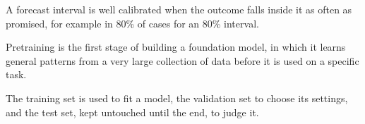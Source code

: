 \begin{keyterms}
\small
\begin{description}[leftmargin=0pt, itemsep=2pt, parsep=0pt, font=\normalfont\bfseries\color{FEMaroon}]
  \item[Forecast interval calibration.] A forecast interval is well calibrated when the outcome falls inside it as often as promised, for example in 80\% of cases for an 80\% interval.
  \item[Pretraining.] Pretraining is the first stage of building a foundation model, in which it learns general patterns from a very large collection of data before it is used on a specific task.
  \item[Training, validation and test sets.] The training set is used to fit a model, the validation set to choose its settings, and the test set, kept untouched until the end, to judge it.
\end{description}
\end{keyterms}
